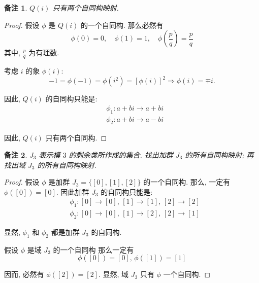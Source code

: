 \documentclass[utf8]{ctexbook}
\newtheorem{memo}{备注}[section]
\begin{document}
\begin{memo}
$Q(i)$ 只有两个自同构映射.
\end{memo}

\begin{proof}
假设 $\phi$ 是 $Q(i)$ 的一个自同构. 那么必然有
\begin{equation}
\phi(0) = 0, \quad \phi(1) = 1, \quad \phi(\frac{p}{q}) = \frac{p}{q}
\end{equation}
其中, $\frac{p}{q}$ 为有理数.

考虑 $i$ 的象 $\phi(i)$:
\begin{equation}
-1 = \phi(-1) = \phi(i^2) = [\phi(i)]^2 \Longrightarrow \phi(i) = \mp i .
\end{equation}

因此, $Q(i)$ 的自同构只能是:
\begin{align*}
& \phi_1 : a + bi \longrightarrow a + bi \\
& \phi_2 : a + bi \longrightarrow a - bi
\end{align*}

因此, $Q(i)$ 只有两个自同构.

\end{proof}


\begin{memo}
$J_3$ 表示模 $3$ 的剩余类所作成的集合. 找出加群 $J_3$ 的所有自同构映射; 再找出域 $J_3$ 的所有自同构映射.
\end{memo}

\begin{proof}
假设 $\phi$ 是加群 $J_3 = \{[0], [1], [2] \}$ 的一个自同构. 那么, 一定有 $\phi([0]) = [0]$. 因此加群 $J_3$ 的自同构只能是:
\begin{align*}
& \phi_1 : [0] \rightarrow [0], \, [1] \rightarrow [1], \, [2] \rightarrow [2] \\
& \phi_2 : [0] \rightarrow [0], \, [1] \rightarrow [2], \, [2] \rightarrow [1]
\end{align*}

显然, $\phi_1$ 和 $\phi_2 $ 都是加群 $J_3$ 的自同构.

假设 $\phi$ 是域 $J_3$ 的一个自同构 那么一定有
\begin{equation}
\phi([0]) = [0] ,\, \phi([1]) = [1] 
\end{equation}

因而, 必然有 $\phi([2]) = [2]$. 显然, 域 $J_3$ 只有 $\phi$ 一个自同构.


\end{proof}
\end{document}
